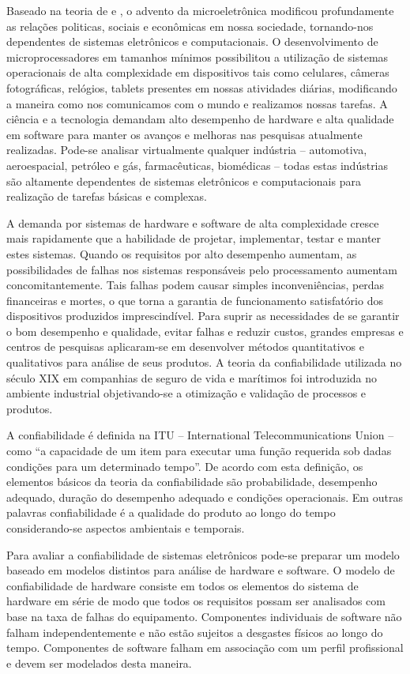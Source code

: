 \begin{anexosenv}
Baseado na teoria de  e , o advento da microeletrônica modificou profundamente as relações politicas, sociais e econômicas em nossa sociedade, tornando-nos dependentes de sistemas eletrônicos e computacionais. O desenvolvimento de microprocessadores em tamanhos mínimos possibilitou a utilização de sistemas operacionais de alta complexidade em dispositivos tais como celulares, câmeras fotográficas, relógios, tablets presentes em nossas atividades diárias, modificando a maneira como nos comunicamos com o mundo e realizamos nossas tarefas. A ciência e a tecnologia demandam alto desempenho de hardware e alta qualidade em software para manter os avanços e melhoras nas pesquisas atualmente realizadas. Pode-se analisar virtualmente qualquer indústria – automotiva, aeroespacial, petróleo e gás, farmacêuticas, biomédicas – todas estas indústrias são altamente dependentes de sistemas eletrônicos e computacionais para realização de tarefas básicas e complexas.

A demanda por sistemas de hardware e software de alta complexidade cresce mais rapidamente que a habilidade de projetar, implementar, testar e manter estes sistemas. Quando os requisitos por alto desempenho aumentam, as possibilidades de falhas nos sistemas responsáveis pelo processamento aumentam concomitantemente. Tais falhas podem causar simples inconveniências, perdas financeiras e mortes, o que torna a garantia de funcionamento satisfatório dos dispositivos produzidos imprescindível. 
Para suprir as necessidades de se garantir o bom desempenho e qualidade, evitar falhas e reduzir custos, grandes empresas e centros de pesquisas aplicaram-se em desenvolver métodos quantitativos e qualitativos para análise de seus produtos. A teoria da confiabilidade utilizada no século XIX em companhias de seguro de vida e marítimos foi introduzida no ambiente industrial objetivando-se a otimização e validação de processos e produtos. 

A confiabilidade é definida na ITU – International Telecommunications Union – como “a capacidade de um item para executar uma função requerida sob dadas condições para um determinado tempo”. De acordo com esta definição, os elementos básicos da teoria da confiabilidade são probabilidade, desempenho adequado, duração do desempenho adequado e condições operacionais. Em outras palavras confiabilidade é a qualidade do produto ao longo do tempo considerando-se aspectos ambientais e temporais.

Para avaliar a confiabilidade de sistemas eletrônicos pode-se preparar um modelo baseado em modelos distintos para análise de hardware e software. O modelo de confiabilidade de hardware consiste em todos os elementos do sistema de hardware em série de modo que todos os requisitos possam ser analisados com base na taxa de falhas do equipamento. Componentes individuais de software não falham independentemente e não estão sujeitos a desgastes físicos ao longo do tempo. Componentes de software falham em associação com um perfil profissional e devem ser modelados desta maneira.


\end{anexosenv}
